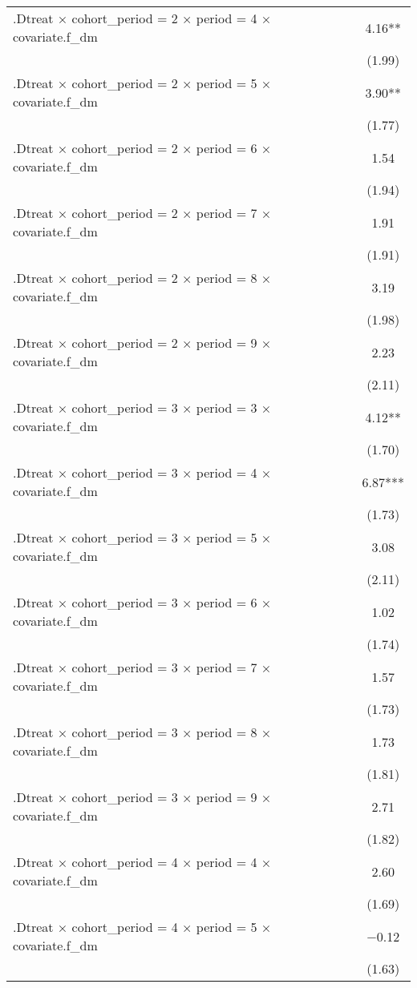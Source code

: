 \begin{table}
\begin{tabular}[t]{lc}
.Dtreat × cohort\_period = 2 × period = 4 × covariate.f\_dm & \num{4.16}**\\
 & (\num{1.99})\\
.Dtreat × cohort\_period = 2 × period = 5 × covariate.f\_dm & \num{3.90}**\\
 & (\num{1.77})\\
.Dtreat × cohort\_period = 2 × period = 6 × covariate.f\_dm & \num{1.54}\\
 & (\num{1.94})\\
.Dtreat × cohort\_period = 2 × period = 7 × covariate.f\_dm & \num{1.91}\\
 & (\num{1.91})\\
.Dtreat × cohort\_period = 2 × period = 8 × covariate.f\_dm & \num{3.19}\\
 & (\num{1.98})\\
.Dtreat × cohort\_period = 2 × period = 9 × covariate.f\_dm & \num{2.23}\\
 & \vphantom{1} (\num{2.11})\\
.Dtreat × cohort\_period = 3 × period = 3 × covariate.f\_dm & \num{4.12}**\\
 & (\num{1.70})\\
.Dtreat × cohort\_period = 3 × period = 4 × covariate.f\_dm & \num{6.87}***\\
 & \vphantom{1} (\num{1.73})\\
.Dtreat × cohort\_period = 3 × period = 5 × covariate.f\_dm & \num{3.08}\\
 & (\num{2.11})\\
.Dtreat × cohort\_period = 3 × period = 6 × covariate.f\_dm & \num{1.02}\\
 & \vphantom{1} (\num{1.74})\\
.Dtreat × cohort\_period = 3 × period = 7 × covariate.f\_dm & \num{1.57}\\
 & (\num{1.73})\\
.Dtreat × cohort\_period = 3 × period = 8 × covariate.f\_dm & \num{1.73}\\
 & (\num{1.81})\\
.Dtreat × cohort\_period = 3 × period = 9 × covariate.f\_dm & \num{2.71}\\
 & (\num{1.82})\\
.Dtreat × cohort\_period = 4 × period = 4 × covariate.f\_dm & \num{2.60}\\
 & \vphantom{1} (\num{1.69})\\
.Dtreat × cohort\_period = 4 × period = 5 × covariate.f\_dm & \num{-0.12}\\
 & (\num{1.63})\\

\end{tabular}
\end{table}
